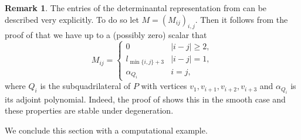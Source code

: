 \documentclass[a4paper,10pt]{amsart}
\theoremstyle{definition}
\newtheorem{rem}[Def]{Remark}
\theoremstyle{plain}
\begin{document}
\begin{rem} \label{rem:detRepExpl}
 The entries of the determinantal representation from  can be described very explicitly. To do so let $M = (M_{ij})_{i,j}$. Then it follows from the proof of  that we have up to a (possibly zero) scalar that
 \begin{equation*}
     M_{ij} = \left\lbrace \begin{array}{ll}
         0 & |i-j| \geq 2, \\
         l_{\min\{i,j\}+3} & |i-j| = 1,\\
         \alpha_{Q_i} & i = j,
     \end{array}\right.
 \end{equation*}
 where $Q_i$ is the subquadrilateral of $P$ with vertices $v_1, v_{i+1}, v_{i+2}, v_{i+3}$ and $\alpha_{Q_i}$ is its adjoint polynomial. Indeed, the proof of  shows this  in the smooth case and these properties are stable under degeneration.
\end{rem}

We conclude this section with a computational example.
\end{document}
